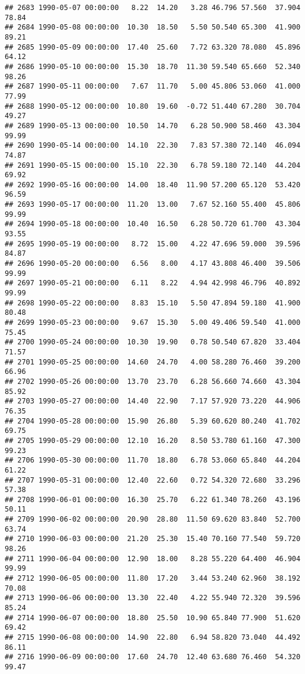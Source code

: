 \documentclass{article}\usepackage{graphicx, color}
\makeatletter
\newenvironment{kframe}{%
 \def\at@end@of@kframe{}%
 \ifinner\ifhmode%
  \def\at@end@of@kframe{\end{minipage}}%
  \begin{minipage}{\columnwidth}%
 \fi\fi%
 \def\FrameCommand##1{\hskip\@totalleftmargin \hskip-\fboxsep
 \colorbox{shadecolor}{##1}\hskip-\fboxsep
     \hskip-\linewidth \hskip-\@totalleftmargin \hskip\columnwidth}%
 \MakeFramed {\advance\hsize-\width
   \@totalleftmargin\z@ \linewidth\hsize
   \@setminipage}}%
 {\par\unskip\endMakeFramed%
 \at@end@of@kframe}
\newenvironment{knitrout}{}{} %
\makeatother
\begin{document}
\begin{knitrout}
\begin{kframe}
\begin{verbatim}
## 2683 1990-05-07 00:00:00   8.22  14.20   3.28 46.796 57.560  37.904  78.84
## 2684 1990-05-08 00:00:00  10.30  18.50   5.50 50.540 65.300  41.900  89.21
## 2685 1990-05-09 00:00:00  17.40  25.60   7.72 63.320 78.080  45.896  64.12
## 2686 1990-05-10 00:00:00  15.30  18.70  11.30 59.540 65.660  52.340  98.26
## 2687 1990-05-11 00:00:00   7.67  11.70   5.00 45.806 53.060  41.000  77.99
## 2688 1990-05-12 00:00:00  10.80  19.60  -0.72 51.440 67.280  30.704  49.27
## 2689 1990-05-13 00:00:00  10.50  14.70   6.28 50.900 58.460  43.304  99.99
## 2690 1990-05-14 00:00:00  14.10  22.30   7.83 57.380 72.140  46.094  74.87
## 2691 1990-05-15 00:00:00  15.10  22.30   6.78 59.180 72.140  44.204  69.92
## 2692 1990-05-16 00:00:00  14.00  18.40  11.90 57.200 65.120  53.420  96.59
## 2693 1990-05-17 00:00:00  11.20  13.00   7.67 52.160 55.400  45.806  99.99
## 2694 1990-05-18 00:00:00  10.40  16.50   6.28 50.720 61.700  43.304  93.55
## 2695 1990-05-19 00:00:00   8.72  15.00   4.22 47.696 59.000  39.596  84.87
## 2696 1990-05-20 00:00:00   6.56   8.00   4.17 43.808 46.400  39.506  99.99
## 2697 1990-05-21 00:00:00   6.11   8.22   4.94 42.998 46.796  40.892  99.99
## 2698 1990-05-22 00:00:00   8.83  15.10   5.50 47.894 59.180  41.900  80.48
## 2699 1990-05-23 00:00:00   9.67  15.30   5.00 49.406 59.540  41.000  75.45
## 2700 1990-05-24 00:00:00  10.30  19.90   0.78 50.540 67.820  33.404  71.57
## 2701 1990-05-25 00:00:00  14.60  24.70   4.00 58.280 76.460  39.200  66.96
## 2702 1990-05-26 00:00:00  13.70  23.70   6.28 56.660 74.660  43.304  85.92
## 2703 1990-05-27 00:00:00  14.40  22.90   7.17 57.920 73.220  44.906  76.35
## 2704 1990-05-28 00:00:00  15.90  26.80   5.39 60.620 80.240  41.702  69.75
## 2705 1990-05-29 00:00:00  12.10  16.20   8.50 53.780 61.160  47.300  99.23
## 2706 1990-05-30 00:00:00  11.70  18.80   6.78 53.060 65.840  44.204  61.22
## 2707 1990-05-31 00:00:00  12.40  22.60   0.72 54.320 72.680  33.296  57.38
## 2708 1990-06-01 00:00:00  16.30  25.70   6.22 61.340 78.260  43.196  50.11
## 2709 1990-06-02 00:00:00  20.90  28.80  11.50 69.620 83.840  52.700  63.74
## 2710 1990-06-03 00:00:00  21.20  25.30  15.40 70.160 77.540  59.720  98.26
## 2711 1990-06-04 00:00:00  12.90  18.00   8.28 55.220 64.400  46.904  99.99
## 2712 1990-06-05 00:00:00  11.80  17.20   3.44 53.240 62.960  38.192  70.08
## 2713 1990-06-06 00:00:00  13.30  22.40   4.22 55.940 72.320  39.596  85.24
## 2714 1990-06-07 00:00:00  18.80  25.50  10.90 65.840 77.900  51.620  69.42
## 2715 1990-06-08 00:00:00  14.90  22.80   6.94 58.820 73.040  44.492  86.11
## 2716 1990-06-09 00:00:00  17.60  24.70  12.40 63.680 76.460  54.320  99.47

\end{verbatim}
\end{kframe}
\end{knitrout}
\end{document}
